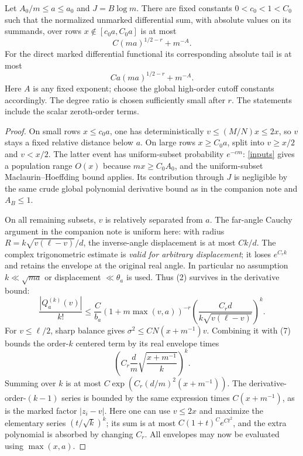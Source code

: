 \documentclass[11pt]{article}
\begin{document}
\begin{theorem}\label{relative}
Let $A_0/m\le a\le a_0$ and $J=B\log m$.
There are fixed constants $0<c_0<1<C_0$ such that the normalized
unmarked differential sum, with absolute values on its summands,
over rows $x\notin[c_0a,C_0a]$ is at most
\[
 C(ma)^{1/2-r}+m^{-A}.                                  \tag{5}
\]
For the direct marked differential functional its corresponding
absolute tail is at most
\[
 C a(ma)^{1/2-r}+m^{-A}.                                \tag{6}
\]
Here $A$ is any fixed exponent; choose the global high-order cutoff
constants accordingly. The degree ratio is chosen sufficiently small
after $r$. The statements include the scalar zeroth-order terms.
\end{theorem}
\begin{proof}
On small rows $x\le c_0a$, one has deterministically
$v\le(M/N)x\le2x$, so $v$ stays a fixed relative distance below $a$.
On large rows $x\ge C_0a$, split into $v\ge x/2$ and $v<x/2$.
The latter event has uniform-subset probability $e^{-cm}$:
\eqref{inputs} gives a population range $O(x)$ because $mx\ge C_0A_0$,
and the uniform-subset Maclaurin--Hoeffding bound applies.
Its contribution through $J$ is negligible by the same crude global
polynomial derivative bound as in the companion note and $A_B\le1$.

On all remaining subsets, $v$ is relatively separated from $a$.
The far-angle Cauchy argument in the companion note is uniform here:
with radius $R=k\sqrt{v(\ell-v)}/d$, the inverse-angle displacement
is at most $Ck/d$. The complex trigonometric estimate is
\emph{valid for arbitrary displacement}; it loses $e^{C_r k}$ and
retains the envelope at the original real angle. In particular no
assumption $k\ll\sqrt{ma}$ or displacement $\ll\theta_a$ is used.
Thus (2) survives in the derivative bound:
\[
 \frac{|Q_a^{(k)}(v)|}{k!}
 \le \frac C{b_a}(1+m\max(v,a))^{-r}
       \left(\frac{C_r d}{k\sqrt{v(\ell-v)}}\right)^k.    \tag{7}
\]
For $v\le\ell/2$, sharp balance gives
$\sigma^2\le CN(x+m^{-1})v$.
Combining it with (7) bounds the order-$k$ centered term by its
real envelope times
\[
 \left(C_r\frac dm\sqrt{\frac{x+m^{-1}}k}\right)^k.
\]
Summing over $k$ is at most $C\exp(C_r(d/m)^2(x+m^{-1}))$.
The derivative-order-$(k-1)$ series is bounded by the same expression
times $C(x+m^{-1})$, as is the marked factor $|z_i-v|$.
Here one can use $v\le2x$ and maximize the elementary series
$(t/\sqrt k)^k$; its sum is at most $C(1+t)^C e^{Ct^2}$,
and the extra polynomial is absorbed by changing $C_r$.
All envelopes may now be evaluated using $\max(x,a)$.


\end{proof}
\end{document}
